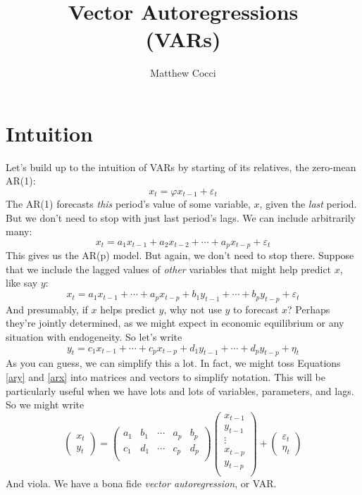 \documentclass[a4paper,12pt]{scrartcl}
\author{Matthew Cocci}
\title{Vector Autoregressions \\ (VARs)}
\date{}
\begin{document}
\maketitle


\section{Intuition}

Let's build up to the intuition of VARs by starting of its
relatives, the zero-mean AR(1):
    \[ x_t = \varphi x_{t-1} + \varepsilon_t \]
The AR(1) forecasts \emph{this} period's value 
of some variable, $x$, given the \emph{last} period. 
But we don't need to stop with just
last period's lags.  We can include arbitrarily many:
    \[ x_t = a_1 x_{t-1} + a_2 x_{t-2} + \cdots
	+ a_p x_{t-p} + \varepsilon_t \]
This gives us the AR(p) model. But again,
we don't need to stop there. Suppose that we include
the lagged values of \emph{other} variables that might
help predict $x$, like say $y$:
\begin{equation}
    \label{ary}
     x_t = a_1 x_{t-1}  + \cdots +
	a_p x_{t-p} + b_1 y_{t-1} +  \cdots
	+ b_p y_{t-p} + \varepsilon_t 
\end{equation}
And presumably, if $x$ helps predict $y$, why not use 
$y$ to forecast $x$? Perhaps they're jointly determined, 
as we might expect in economic equilibrium or any situation
with endogeneity. So let's write
\begin{equation}
    \label{arx}
    y_t = c_1 x_{t-1} +  \cdots + c_p x_{t-p} 
	+ d_1 y_{t-1}  + \cdots +
	d_p y_{t-p} + \eta_t 
\end{equation}
As you can guess, we can simplify this a lot. In fact,
we might toss Equations \ref{ary} and \ref{arx} into
matrices and vectors to simplify notation.  This
will be particularly useful when we have lots and
lots of variables, parameters, and lags. So we might
write
\begin{equation}
    \begin{pmatrix} x_t \\ y_t \end{pmatrix} = 
	\begin{pmatrix} a_1 & b_1 & \cdots & a_p & b_p \\
	    c_1 & d_1 & \cdots & c_p & d_p \\
	\end{pmatrix}
	\begin{pmatrix} x_{t-1} \\ y_{t-1} \\
	    \vdots \\ 
	    x_{t-p} \\ y_{t-p} \\
	\end{pmatrix}  
	+ \begin{pmatrix} \varepsilon_t \\ \eta_t
	 \end{pmatrix}
\end{equation}
And viola. We have a bona fide \emph{vector autoregression}, 
or VAR. 
\end{document}
